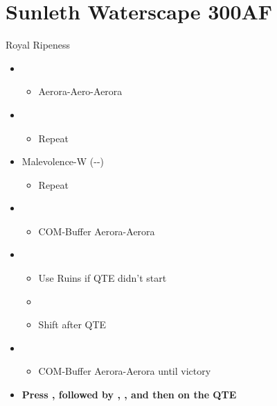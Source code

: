 \chapter{Sunleth Waterscape 300AF}

\renewcommand{\second}{[2] Malevolence-W (\rav-\rav-\gah)}
\begin{battle}{Royal Ripeness}
	\begin{itemize}
		\item \sixth
		      \begin{itemize}
			      \item Aerora-Aero-Aerora
		      \end{itemize}
		\item \third
		      \begin{itemize}
			      \item Repeat
		      \end{itemize}
		\item \second
		      \begin{itemize}
			      \item Repeat
		      \end{itemize}
		\item \sixth
		      \begin{itemize}
			      \item COM-Buffer Aerora-Aerora
		      \end{itemize}
		\item \first
		      \begin{itemize}
			      \item Use Ruins if QTE didn't start
			      \item \QTE{\squarec}
			      \item Shift after QTE
		      \end{itemize}
		\item \sixth
		      \begin{itemize}
			      \item COM-Buffer Aerora-Aerora until victory
		      \end{itemize}
		\item \textbf{Press \upc, followed by \squarec, \squarec, \circlec and then \rightc on the QTE}
	\end{itemize}
\end{battle}



